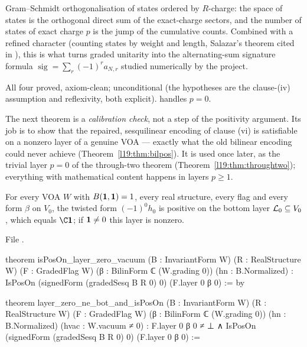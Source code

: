 \begin{physics}
Gram--Schmidt orthogonalisation of states ordered by $R$-charge: the space of states is the
orthogonal direct sum of the exact-charge sectors, and the number of states of exact charge $p$ is
the jump of the cumulative counts. Combined with a refined character (counting states by weight and
length, Salazar's theorem cited in ), this is what turns graded unitarity
into the alternating-sum signature formula $\operatorname{sig} = \sum_r(-1)^ra_{N,r}$ studied
numerically by the project.
\end{physics}

\begin{status}
All four proved, axiom-clean; unconditional (the hypotheses are the clause-(iv) assumption and
reflexivity, both explicit).  handles $p = 0$.
\end{status}

The next theorem is a \emph{calibration check}, not a step of the positivity argument. Its job is to show that
the repaired, sesquilinear encoding of clause (vi) is satisfiable on a nonzero layer of a genuine VOA --- exactly
what the old bilinear encoding could never achieve (Theorem~\ref{l19:thm:bilpos}). It is used once later, as the
trivial layer $p=0$ of the through-two theorem (Theorem~\ref{l19:thm:throughtwo}); everything with mathematical
content happens in layers $p\ge1$.

\begin{theorem}\label{l19:thm:vacuum}
For every VOA $W$ with $B(\mathbf{1},\mathbf{1}) = 1$, every real structure, every flag and every
form $\beta$ on $V_0$, the twisted form $(-1)^0h_0$ is positive on the bottom layer
$\mathcal{L}_0\subseteq V_0$, which equals $\C\lnineteenvac$; if $\mathbf{1}\ne0$ this layer is nonzero.
\end{theorem}

\noindent File .
\begin{leancode}
theorem isPosOn_layer_zero_vacuum (B : InvariantForm W) (R : RealStructure W) (F : GradedFlag W)
    (β : BilinForm ℂ (W.grading 0)) (hn : B.Normalized) :
    IsPosOn (signedForm (gradedSesq B R 0) 0) (F.layer 0 β 0) := by

theorem layer_zero_ne_bot_and_isPosOn (B : InvariantForm W) (R : RealStructure W)
    (F : GradedFlag W) (β : BilinForm ℂ (W.grading 0)) (hn : B.Normalized)
    (hvac : W.vacuum ≠ 0) :
    F.layer 0 β 0 ≠ ⊥ ∧ IsPosOn (signedForm (gradedSesq B R 0) 0) (F.layer 0 β 0) :=
\end{leancode}

